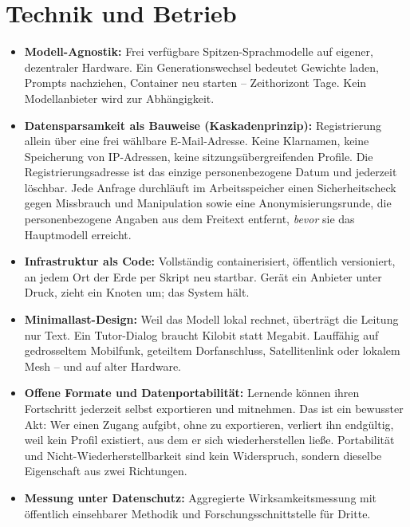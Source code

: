 \documentclass[11pt,a4paper]{article}
\begin{document}
\section{Technik und Betrieb}
\begin{itemize}[label=--]
    \item \textbf{Modell-Agnostik:} Frei verfügbare Spitzen-Sprachmodelle auf eigener, dezentraler Hardware. Ein Generationswechsel bedeutet Gewichte laden, Prompts nachziehen, Container neu starten -- Zeithorizont Tage. Kein Modellanbieter wird zur Abhängigkeit.
    \item \textbf{Datensparsamkeit als Bauweise (Kaskadenprinzip):} Registrierung allein über eine frei wählbare E-Mail-Adresse. Keine Klarnamen, keine Speicherung von IP-Adressen, keine sitzungsübergreifenden Profile. Die Registrierungsadresse ist das einzige personenbezogene Datum und jederzeit löschbar. Jede Anfrage durchläuft im Arbeitsspeicher einen Sicherheitscheck gegen Missbrauch und Manipulation sowie eine Anonymisierungsrunde, die personenbezogene Angaben aus dem Freitext entfernt, \textit{bevor} sie das Hauptmodell erreicht.
    \item \textbf{Infrastruktur als Code:} Vollständig containerisiert, öffentlich versioniert, an jedem Ort der Erde per Skript neu startbar. Gerät ein Anbieter unter Druck, zieht ein Knoten um; das System hält.
    \item \textbf{Minimallast-Design:} Weil das Modell lokal rechnet, überträgt die Leitung nur Text. Ein Tutor-Dialog braucht Kilobit statt Megabit. Lauffähig auf gedrosseltem Mobilfunk, geteiltem Dorfanschluss, Satellitenlink oder lokalem Mesh -- und auf alter Hardware.
    \item \textbf{Offene Formate und Datenportabilität:} Lernende können ihren Fortschritt jederzeit selbst exportieren und mitnehmen. Das ist ein bewusster Akt: Wer einen Zugang aufgibt, ohne zu exportieren, verliert ihn endgültig, weil kein Profil existiert, aus dem er sich wiederherstellen ließe. Portabilität und Nicht-Wiederherstellbarkeit sind kein Widerspruch, sondern dieselbe Eigenschaft aus zwei Richtungen.
    \item \textbf{Messung unter Datenschutz:} Aggregierte Wirksamkeitsmessung mit öffentlich einsehbarer Methodik und Forschungsschnittstelle für Dritte.
\end{itemize}
\end{document}
